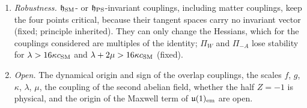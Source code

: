 \begin{enumerate}[label=(\alph*),leftmargin=2.2em]
\item \emph{Robustness.} $\mathfrak h_{\rm SM}$- or $\mathfrak h_{\rm PS}$-invariant couplings, including matter couplings, keep the four points critical, because their
tangent spaces carry no invariant vector (fixed; principle inherited). They can only change the Hessians, which for the couplings considered are multiples of the identity;
$\Pi_W$ and $\Pi_{-A}$ lose stability for $\lambda>16\kappa c_{\rm SM}$ and $\lambda+2\mu>16\kappa c_{\rm SM}$ (fixed).
\item \emph{Open.} The dynamical origin and sign of the overlap couplings, the scales $f$, $g$, $\kappa$, $\lambda$, $\mu$, the coupling of the second abelian field, whether the
half $Z=-1$ is physical, and the origin of the Maxwell term of $\mathfrak{u}(1)_{\rm em}$ are open.
\end{enumerate}

